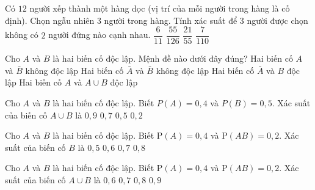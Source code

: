 \begin{ex}%
	Có $12$ người xếp thành một hàng dọc (vị trí của mỗi người trong hàng là cố định). Chọn ngẫu nhiên $3$ người trong hàng. Tính xác suất để $3$ người được chọn không có $2$ người đứng nào cạnh nhau.
	\choice
	{\True $ \dfrac{6}{11} $}
	{$ \dfrac{55}{126} $}
	{$ \dfrac{21}{55} $}
	{$\dfrac{7}{110} $}
\end{ex}
\begin{ex}
	Cho $A$ và $B$ là hai biến cố độc lập. Mệnh đề nào dưới đây đúng?
	\choice
	{\True Hai biến cố $A$ và $\bar{B}$ không độc lập}
	{Hai biến cố $\bar{A}$ và $\bar{B}$ không độc lập}
	{Hai biến cố $\bar{A}$ và $B$ độc lập}
	{Hai biến cố $A$ và $A \cup B$ độc lập}
	\loigiai{
		
	}
\end{ex}

\begin{ex}%
	Cho $A$ và $B$ là hai biến cố độc lập. Biết $P(A)=0{,}4$ và $P(B)=0{,}5$. Xác suất của biến cố $A \cup B$ là
	\choice
	{$0{,}9$ }
	{\True $0{,}7$} 
	{$0{,}5$} 
	{$0{,}2$}
\end{ex}

\begin{ex} %
	Cho $A$ và $B$ là hai biến cố độc lập. Biết $\mathrm{P}(A)=0,4$ và $\mathrm{P}(A B)=0,2$. Xác suất của biến cố $B$ là
	\choice
	{\True $0,5$}
	{$0,6$}
	{$0,7$}
	{$0,8$}
\end{ex}
\begin{ex} %
	Cho $A$ và $B$ là hai biến cố độc lập. Biết $\mathrm{P}(A)=0,4$ và $\mathrm{P}(A B)=0,2$. Xác suất của biến cố $A \cup B$ là
	\choice
	{$0,6$}
	{\True $0,7$}
	{$0,8$}
	{$0,9$}
\end{ex}

